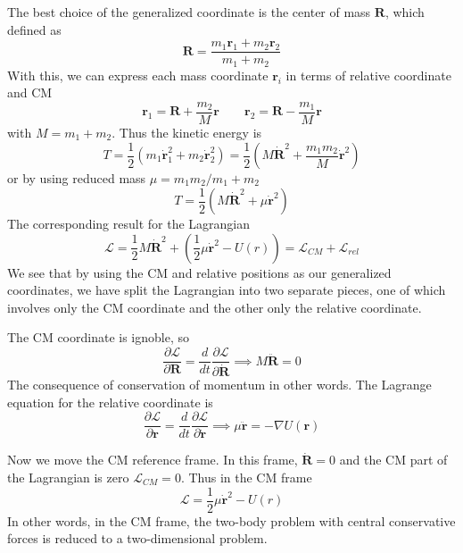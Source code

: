 \documentclass[../../../main.tex]{subfiles}
\begin{document}
The best choice of the generalized coordinate is the center of mass $\mathbf{R}$, which defined as
\begin{equation*}
    \mathbf{R }=\frac{m_1 \mathbf{r}_1+m_2 \mathbf{r}_2}{m_1+m_2}
\end{equation*}
With this, we can express each mass coordinate $\mathbf{r}_i$ in terms of relative coordinate and CM
\begin{equation*}
    \mathbf{r}_1=\mathbf{R}+\frac{m_2}{M}\mathbf{r}
    \qquad
    \mathbf{r}_2=\mathbf{R}-\frac{m_1}{M}\mathbf{r}
\end{equation*}
with $M=m_1+m_2$.
Thus the kinetic energy is
\begin{equation*}
    T=\frac{1 }{2 }\left( m_1 \dot{\mathbf{r}}_1^2+m_2 \dot{\mathbf{r}}_2^2 \right) =\frac{1 }{2}\left( M \mathbf{\dot{R}}^2+\frac{m_1m_2}{M}\dot{\mathbf{r}}^2 \right)
\end{equation*}
or by using reduced mass $\mu=m_1m_2/m_1+m_2$
\begin{equation*}
    T=\frac{1 }{2}\left( M \mathbf{\dot{R}}^2+\mu\dot{\mathbf{r}}^2 \right)
\end{equation*}
The corresponding result for the Lagrangian
\begin{equation*}
    \mathcal{L}=\frac{1 }{2}M \dot{\mathbf{R}}^2+\left( \frac{1 }{2}\mu \dot{\mathbf{r}}^2-U(r) \right)=\mathcal{L}_{CM}+\mathcal{L}_{rel}
\end{equation*}
We see that by using the CM and relative positions as our generalized coordinates, we have split the Lagrangian into two separate pieces, one of which involves only the CM coordinate and the other only the relative coordinate.

The CM coordinate is ignoble, so
\begin{equation*}
    \frac{\partial \mathcal{L }}{\partial \mathbf{R}}=\frac{d }{dt }\frac{\partial \mathcal{L }}{\partial \dot{\mathbf{R}}}
    \implies
    M \ddot{\mathbf{R}}=0
\end{equation*}
The consequence of conservation of momentum in other words.
The Lagrange equation for the relative coordinate is
\begin{equation*}
    \frac{\partial \mathcal{L }}{\partial \mathbf{r}}=\frac{d }{dt }\frac{\partial \mathcal{L }}{\partial \dot{\mathbf{r}}}
    \implies
    \mu \ddot{\mathbf{r}}=- \nabla U(\mathbf{r})
\end{equation*}

Now we move the CM reference frame.
In this frame, $\mathbf{\dot{R}} = 0$ and the CM part of the Lagrangian is zero $\mathcal{L}_{CM} = 0$.
Thus in the CM frame
\begin{equation*}
    \mathcal{L}=\frac{1 }{2 }\mu \mathbf{\dot{r}}^2-U(r)
\end{equation*}
In other words, in the CM frame, the two-body problem with central conservative forces is reduced to a two-dimensional problem.
\end{document}
